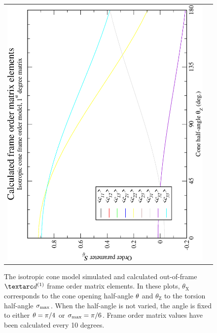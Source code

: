 \begin{figure}
\begin{tabular}{@{}cc@{}}
    \includegraphics[width=.35\textwidth,angle=270]{images/frame_order_matrix/Sij_iso_cone_out_of_frame_theta_z_calc.eps} \\
  \end{tabular}
  \caption[Isotropic cone simulated and calculated out-of-frame Daeg$^{(1)}$ elements.]{
    The isotropic cone model simulated and calculated out-of-frame $\FOone$ frame order matrix elements.
    In these plots, $\theta_\textrm{X}$ corresponds to the cone opening half-angle $\theta$ and $\theta_\textrm{Z}$ to the torsion half-angle $\sigma_\textrm{max}$.
    When the half-angle is not varied, the angle is fixed to either $\theta = \pi/4$ or $\sigma_\textrm{max} = \pi/6$.
    Frame order matrix values have been calculated every 10 degrees.
  }
  \label{fig: simulated and calculated out-of-frame 1st degree iso cone frame order}
\end{figure}

